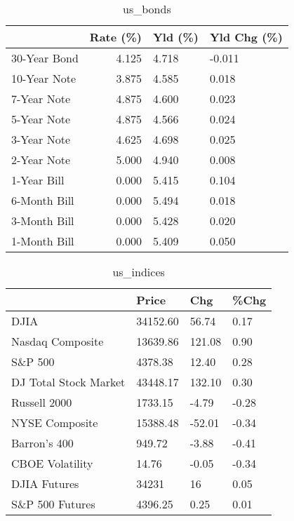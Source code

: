 \documentclass{article}%
\begin{document}
\begin{table}[htbp]%
\caption{us\_bonds}%
\centering%
\begin{adjustbox}{width=1\textwidth}%
\begin{tabular}{lrll}
\toprule
             &  Rate (\%) & Yld (\%) & Yld Chg (\%) \\
\midrule
30-Year Bond &     4.125 &   4.718 &      -0.011 \\
10-Year Note &     3.875 &   4.585 &       0.018 \\
 7-Year Note &     4.875 &   4.600 &       0.023 \\
 5-Year Note &     4.875 &   4.566 &       0.024 \\
 3-Year Note &     4.625 &   4.698 &       0.025 \\
 2-Year Note &     5.000 &   4.940 &       0.008 \\
 1-Year Bill &     0.000 &   5.415 &       0.104 \\
6-Month Bill &     0.000 &   5.494 &       0.018 \\
3-Month Bill &     0.000 &   5.428 &       0.020 \\
1-Month Bill &     0.000 &   5.409 &       0.050 \\
\bottomrule
\end{tabular}
%
\end{adjustbox}%
\end{table}

%


\begin{table}[htbp]%
\caption{us\_indices}%
\centering%
\begin{adjustbox}{width=1\textwidth}%
\begin{tabular}{llll}
\toprule
                      &    Price &    Chg &  \%Chg \\
\midrule
                 DJIA & 34152.60 &  56.74 &  0.17 \\
     Nasdaq Composite & 13639.86 & 121.08 &  0.90 \\
              S\&P 500 &  4378.38 &  12.40 &  0.28 \\
DJ Total Stock Market & 43448.17 & 132.10 &  0.30 \\
         Russell 2000 &  1733.15 &  -4.79 & -0.28 \\
       NYSE Composite & 15388.48 & -52.01 & -0.34 \\
         Barron's 400 &   949.72 &  -3.88 & -0.41 \\
      CBOE Volatility &    14.76 &  -0.05 & -0.34 \\
         DJIA Futures &    34231 &     16 &  0.05 \\
      S\&P 500 Futures &  4396.25 &   0.25 &  0.01 \\
\bottomrule
\end{tabular}
%
\end{adjustbox}%
\end{table}
\end{document}
